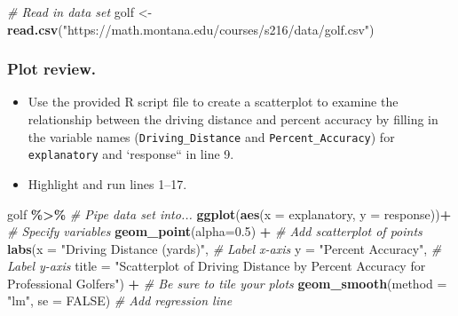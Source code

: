 \documentclass[
]{report}
\newenvironment{Shaded}{\begin{snugshade}}{\end{snugshade}}
\newcommand{\AttributeTok}[1]{\textcolor[rgb]{0.13,0.29,0.53}{#1}}
\newcommand{\CommentTok}[1]{\textcolor[rgb]{0.56,0.35,0.01}{\textit{#1}}}
\newcommand{\ConstantTok}[1]{\textcolor[rgb]{0.56,0.35,0.01}{#1}}
\newcommand{\FloatTok}[1]{\textcolor[rgb]{0.00,0.00,0.81}{#1}}
\newcommand{\FunctionTok}[1]{\textcolor[rgb]{0.13,0.29,0.53}{\textbf{#1}}}
\newcommand{\NormalTok}[1]{#1}
\newcommand{\OtherTok}[1]{\textcolor[rgb]{0.56,0.35,0.01}{#1}}
\newcommand{\SpecialCharTok}[1]{\textcolor[rgb]{0.81,0.36,0.00}{\textbf{#1}}}
\newcommand{\StringTok}[1]{\textcolor[rgb]{0.31,0.60,0.02}{#1}}
\begin{document}
\begin{Shaded}
\begin{Highlighting}[]
\CommentTok{\# Read in data set}
\NormalTok{golf }\OtherTok{\textless{}{-}} \FunctionTok{read.csv}\NormalTok{(}\StringTok{"https://math.montana.edu/courses/s216/data/golf.csv"}\NormalTok{)}
\end{Highlighting}
\end{Shaded}

\hypertarget{plot-review.}{%
\subsubsection*{Plot review.}\label{plot-review.}}

\begin{itemize}
\item
  Use the provided R script file to create a scatterplot to examine the relationship between the driving distance and percent accuracy by filling in the variable names (\texttt{Driving\_Distance} and \texttt{Percent\_Accuracy}) for \texttt{explanatory} and `response`` in line 9.
\item
  Highlight and run lines 1--17.
\end{itemize}

\begin{Shaded}
\begin{Highlighting}[]
\NormalTok{golf }\SpecialCharTok{\%\textgreater{}\%} \CommentTok{\# Pipe data set into...}
\FunctionTok{ggplot}\NormalTok{(}\FunctionTok{aes}\NormalTok{(}\AttributeTok{x =}\NormalTok{ explanatory, }\AttributeTok{y =}\NormalTok{ response))}\SpecialCharTok{+}  \CommentTok{\# Specify variables}
  \FunctionTok{geom\_point}\NormalTok{(}\AttributeTok{alpha=}\FloatTok{0.5}\NormalTok{) }\SpecialCharTok{+}  \CommentTok{\# Add scatterplot of points}
  \FunctionTok{labs}\NormalTok{(}\AttributeTok{x =} \StringTok{"Driving Distance (yards)"}\NormalTok{,  }\CommentTok{\# Label x{-}axis}
       \AttributeTok{y =} \StringTok{"Percent Accuracy"}\NormalTok{,  }\CommentTok{\# Label y{-}axis}
       \AttributeTok{title =} \StringTok{"Scatterplot of Driving Distance by Percent Accuracy}
\StringTok{       for Professional Golfers"}\NormalTok{) }\SpecialCharTok{+} 
               \CommentTok{\# Be sure to tile your plots}
  \FunctionTok{geom\_smooth}\NormalTok{(}\AttributeTok{method =} \StringTok{"lm"}\NormalTok{, }\AttributeTok{se =} \ConstantTok{FALSE}\NormalTok{)  }\CommentTok{\# Add regression line}
\end{Highlighting}
\end{Shaded}
\end{document}
